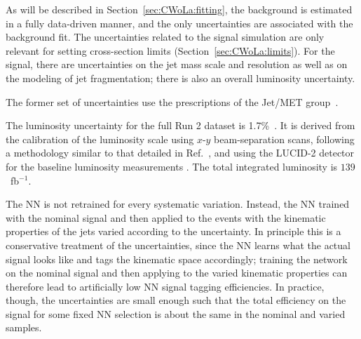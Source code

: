 As will be described in Section~\ref{sec:CWoLa:fitting}, the background is estimated in a fully data-driven manner, and the only uncertainties are associated with the background fit.
The uncertainties related to the signal simulation are only relevant for setting cross-section limits (Section~\ref{sec:CWoLa:limits}).
For the signal, there are uncertainties on the jet mass scale and resolution as well as on the modeling of jet fragmentation; there is also an overall luminosity uncertainty.

The former set of uncertainties use the prescriptions of the Jet/MET group~\cite{TWiki_JetUncertainties_2019}.

The luminosity uncertainty for the full Run 2 dataset is 1.7\%~\cite{TWiki_LuminosityUncertainty}.
It is derived from the calibration of the luminosity scale using $x$-$y$ beam-separation scans, following a methodology similar to that detailed in Ref.~\cite{Aaboud:2016hhf}, and using the LUCID-2 detector for the baseline luminosity measurements \cite{LUCID2}.
The total integrated luminosity is $139$~fb$^{-1}$.


The NN is not retrained for every systematic variation.
Instead, the NN trained with the nominal signal and then applied to the events with the kinematic properties of the jets varied according to the uncertainty.
In principle this is a conservative treatment of the uncertainties, since the NN learns what the actual signal looks like and tags the kinematic space accordingly;
training the network on the nominal signal and then applying to the varied kinematic properties can therefore lead to artificially low NN signal tagging efficiencies.
In practice, though, the uncertainties are small enough such that the total efficiency on the signal for some fixed NN selection is about the same in the nominal and varied samples.



